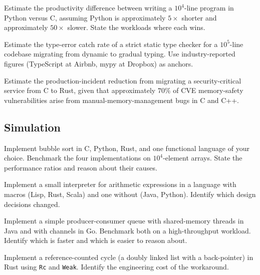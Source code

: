 \begin{exercise}
Estimate the productivity difference between writing a $10^4$-line program in Python versus C, assuming Python is approximately $5\times$ shorter and approximately $50\times$ slower. State the workloads where each wins.
\end{exercise}

\begin{exercise}
Estimate the type-error catch rate of a strict static type checker for a $10^5$-line codebase migrating from dynamic to gradual typing. Use industry-reported figures (TypeScript at Airbnb, mypy at Dropbox) as anchors.
\end{exercise}

\begin{exercise}
Estimate the production-incident reduction from migrating a security-critical service from C to Rust, given that approximately $70\%$ of CVE memory-safety vulnerabilities arise from manual-memory-management bugs in C and C++.
\end{exercise}

\subsection*{Simulation}

\begin{exercise}
Implement bubble sort in C, Python, Rust, and one functional language of your choice. Benchmark the four implementations on $10^4$-element arrays. State the performance ratios and reason about their causes.
\end{exercise}

\begin{exercise}
Implement a small interpreter for arithmetic expressions in a language with macros (Lisp, Rust, Scala) and one without (Java, Python). Identify which design decisions changed.
\end{exercise}

\begin{exercise}
Implement a simple producer-consumer queue with shared-memory threads in Java and with channels in Go. Benchmark both on a high-throughput workload. Identify which is faster and which is easier to reason about.
\end{exercise}

\begin{exercise}
Implement a reference-counted cycle (a doubly linked list with a back-pointer) in Rust using \texttt{Rc} and \texttt{Weak}. Identify the engineering cost of the workaround.
\end{exercise}

